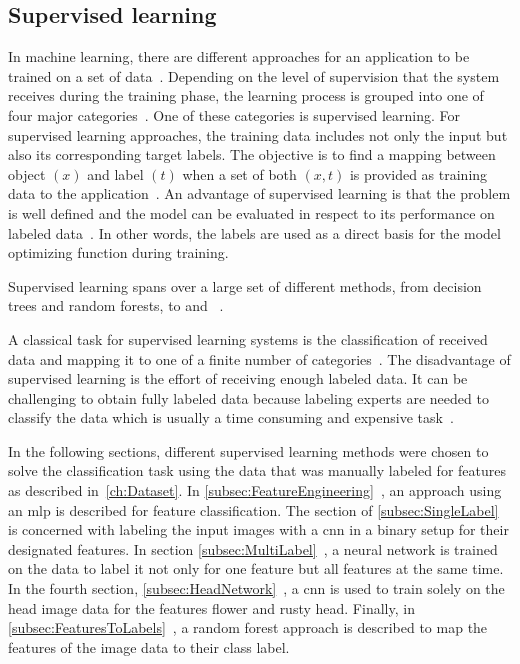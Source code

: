 \subsection{Supervised learning}
\label{sec:SupervisedLearning}

In machine learning, there are different approaches for an application to be trained on a set of data~\citep{geron2019hands,bishop2006pattern}. Depending on the level of supervision that the system receives during the training phase, the learning process is grouped into one of four major categories~\citep{geron2019hands}. One of these categories is supervised learning. For supervised learning approaches, the training data includes not only the input but also its corresponding target labels. The objective is to find a mapping between object \((x)\) and label \((t)\) when a set of both \((x,t)\) is provided as training data to the application~\citep{olivier2006semi}. An advantage of supervised learning is that the problem is well defined and the model can be evaluated in respect to its performance on labeled data~\citep{daume2012course,olivier2006semi}. In other words, the labels are used as a direct basis for the model optimizing function during training.

Supervised learning spans over a large set of different methods, from decision trees and random forests, to   and ~\citep{caruana2006comparison,geron2019hands}.

A classical task for supervised learning systems is the classification of received data and mapping it to one of a finite number of categories~\citep{bishop2006pattern}.
The disadvantage of supervised learning is the effort of receiving enough labeled data. It can be challenging to obtain fully labeled data because labeling experts are needed to classify the data which is usually a time consuming and expensive task~\citep{zhu05survey,figueroa2012predicting}.

\bigskip
In the following sections, different supervised learning methods were chosen to solve the classification task using the data that was manually labeled for features as described in~\autoref{ch:Dataset}. In \ref{subsec:FeatureEngineering}~, an approach using an \acrshort{mlp} is described for feature classification. The section of \ref{subsec:SingleLabel}~ is concerned with labeling the input images with a \acrshort{cnn} in a binary setup for their designated features. In section \ref{subsec:MultiLabel}~, a neural network is trained on the data to label it not only for one feature but all features at the same time. In the fourth section, \ref{subsec:HeadNetwork}~, a \acrshort{cnn} is used to train solely on the head image data for the features flower and rusty head. 
Finally, in \ref{subsec:FeaturesToLabels}~, a random forest approach is described to map the features of the image data to their class label.


